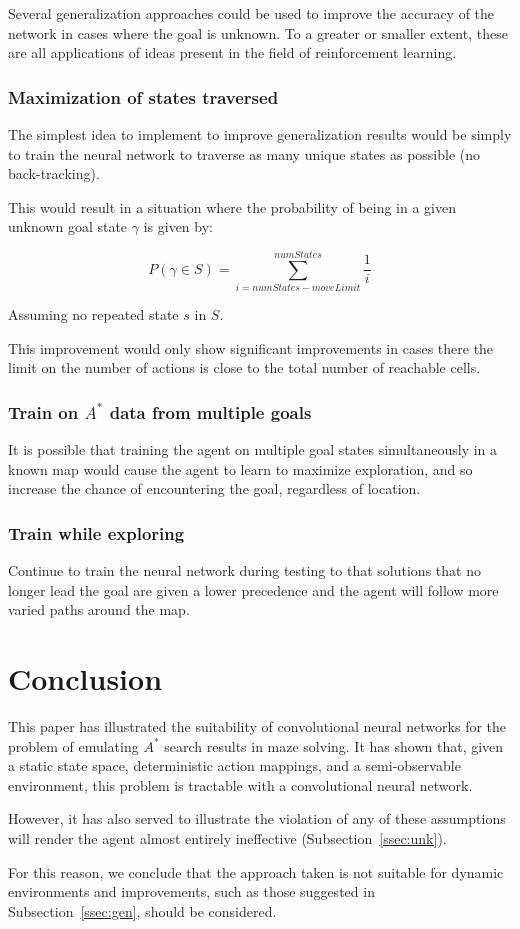 \documentclass{article}
\begin{document}
Several generalization approaches could be used to improve the accuracy of the network in cases where the goal is unknown. To a greater or smaller extent, these are all applications of ideas present in the field of reinforcement learning.

\subsubsection*{Maximization of states traversed}
The simplest idea to implement to improve generalization results would be simply to train the neural network to traverse as many unique states as possible (no back-tracking).

This would result in a situation where the probability of being in a given unknown goal state $\gamma$ is given by:

\[
P(\gamma \in S)=\sum^{numStates}_{i=numStates-moveLimit} \frac{1}{i}
\]

\noindent
Assuming no repeated state $s$ in $S$.

This improvement would only show significant improvements in cases there the limit on the number of actions is close to the total number of reachable cells.

\subsubsection*{Train on $A^*$ data from multiple goals}
It is possible that training the agent on multiple goal states simultaneously in a known map would cause the agent to learn to maximize exploration, and so increase the chance of encountering the goal, regardless of location.

\subsubsection*{Train while exploring}
Continue to train the neural network during testing to that solutions that no longer lead the goal are given a lower precedence and the agent will follow more varied paths around the map.


\section{Conclusion}
This paper has illustrated the suitability of convolutional neural networks for the problem of emulating $A^*$ search results in maze solving. It has shown that, given a static state space, deterministic action mappings, and a semi-observable environment, this problem is tractable with a convolutional neural network.

However, it has also served to illustrate the violation of any of these assumptions will render the agent almost entirely ineffective (Subsection~\ref{ssec:unk}).

For this reason, we conclude that the approach taken is not suitable for dynamic environments and improvements, such as those suggested in Subsection~\ref{ssec:gen}, should be considered.
\end{document}
